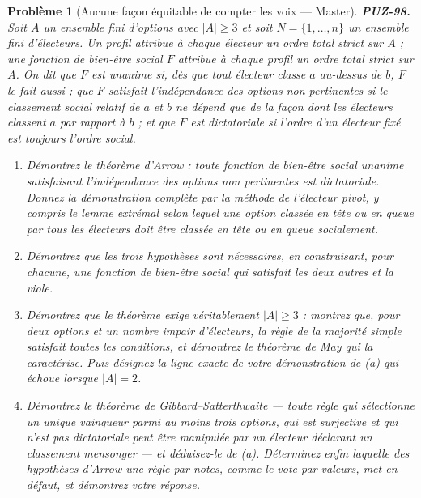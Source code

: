 \documentclass[11pt]{article}
\newtheorem{problem}{Problème}
\begin{document}
\begin{problem}[{Aucune façon équitable de compter les voix --- Master}]
\textbf{PUZ-98.} Soit $ A $ un ensemble fini d'options avec $ |A| \ge 3 $ et soit
$ N = \{1, \dots, n\} $ un ensemble fini d'électeurs. Un \textit{profil} attribue à chaque
électeur un ordre total strict sur $ A $ ; une \textit{fonction de bien-être social} $ F $
attribue à chaque profil un ordre total strict sur $ A $. On dit que $ F $ est
\textit{unanime} si, dès que tout électeur classe $ a $ au-dessus de $ b $, $ F $ le fait
aussi ; que $ F $ satisfait l'\textit{indépendance des options non pertinentes} si le
classement social relatif de $ a $ et $ b $ ne dépend que de la façon dont les électeurs
classent $ a $ par rapport à $ b $ ; et que $ F $ est \textit{dictatoriale} si l'ordre
d'un électeur fixé est toujours l'ordre social.
\begin{enumerate}
\item[(a)] Démontrez le théorème d'Arrow : toute fonction de bien-être social unanime satisfaisant
l'indépendance des options non pertinentes est dictatoriale. Donnez la démonstration
complète par la méthode de l'électeur pivot, y compris le lemme extrémal selon lequel une
option classée en tête ou en queue par tous les électeurs doit être classée en tête ou en
queue socialement.
\item[(b)] Démontrez que les trois hypothèses sont nécessaires, en construisant, pour chacune, une
fonction de bien-être social qui satisfait les deux autres et la viole.
\item[(c)] Démontrez que le théorème exige véritablement $ |A| \ge 3 $ : montrez que, pour deux
options et un nombre impair d'électeurs, la règle de la majorité simple satisfait toutes les
conditions, et démontrez le théorème de May qui la caractérise. Puis désignez la ligne exacte
de votre démonstration de (a) qui échoue lorsque $ |A| = 2 $.
\item[(d)] Démontrez le théorème de Gibbard--Satterthwaite --- toute règle qui sélectionne un unique
vainqueur parmi au moins trois options, qui est surjective et qui n'est pas dictatoriale peut
être manipulée par un électeur déclarant un classement mensonger --- et déduisez-le de (a).
Déterminez enfin laquelle des hypothèses d'Arrow une règle par notes, comme le vote par
valeurs, met en défaut, et démontrez votre réponse.
\end{enumerate}

\end{problem}
\end{document}
